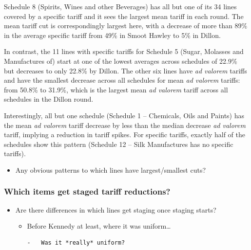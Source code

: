 \documentclass[
  12pt,
]{article}
\providecommand{\tightlist}{%
  \setlength{\itemsep}{0pt}\setlength{\parskip}{0pt}}
\begin{document}
Schedule 8 (Spirits, Wines and other Beverages) has all but one of its 34 lines covered by a specific tariff and it sees the largest mean tariff in each round. The mean tariff cut is correspondingly largest here, with a decrease of more than 89\% in the average specific tariff from 49\% in Smoot Hawley to 5\% in Dillon.

In contrast, the 11 lines with specific tariffs for Schedule 5 (Sugar, Molasses and Manufactures of) start at one of the lowest averages across schedules of 22.9\% but decreases to only 22.8\% by Dillon. The other six lines have \emph{ad valorem} tariffs and have the smallest decrease across all schedules for mean \emph{ad valorem} tariffs: from 50.8\% to 31.9\%, which is the largest mean \emph{ad valorem} tariff across all schedules in the Dillon round.

Interestingly, all but one schedule (Schedule 1 -- Chemicals, Oils and Paints) has the mean \emph{ad valorem} tariff decrease by less than the median decrease \emph{ad valorem} tariff, implying a reduction in tariff spikes. For specific tariffs, exactly half of the schedules show this pattern (Schedule 12 -- Silk Manufactures has no specific tariffs).

\begin{itemize}
\tightlist
\item
  Any obvious patterns to which lines have largest/smallest cuts?
\end{itemize}

\hypertarget{which-items-get-staged-tariff-reductions}{%
\subsubsection{Which items get staged tariff reductions?}\label{which-items-get-staged-tariff-reductions}}

\begin{itemize}
\item
  Are there differences in which lines get staging once staging starts?

  \begin{itemize}
  \item
    Before Kennedy at least, where it was uniform\ldots{}

\begin{verbatim}
-   Was it *really* uniform?
\end{verbatim}
  \end{itemize}
\end{itemize}
\end{document}
